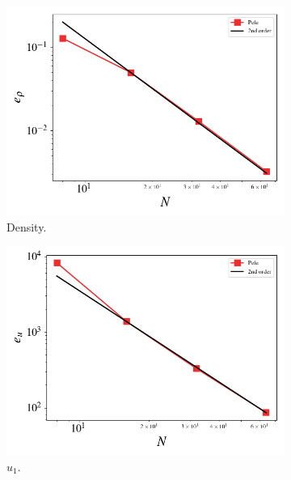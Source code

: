 \documentclass[10pt]{article}
\begin{document}
\begin{figure}%
  \centering%
  \begin{subfigure}[b]{0.49\textwidth}%
    \includegraphics[width=\textwidth]{./rho_error.png}
    \caption{Density.}%
    \label{fig:}%
  \end{subfigure}%
  \begin{subfigure}[b]{0.49\textwidth}%
    \includegraphics[width=\textwidth]{./u_error.png}%
    \caption{$u_1$.}%
    \label{fig:}%
  \end{subfigure}\hfill%
  \begin{subfigure}[b]{0.49\textwidth}%

\end{subfigure}
\end{figure}
\end{document}
